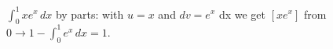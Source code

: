 $\int_{0}^{1} xe^{x} \,dx$ by parts: with $u = x$ and $dv = e^{x}$ dx we get $[xe^{x}]$ from $0 \to 1 - \int_{0}^{1} e^{x} \,dx = 1$.